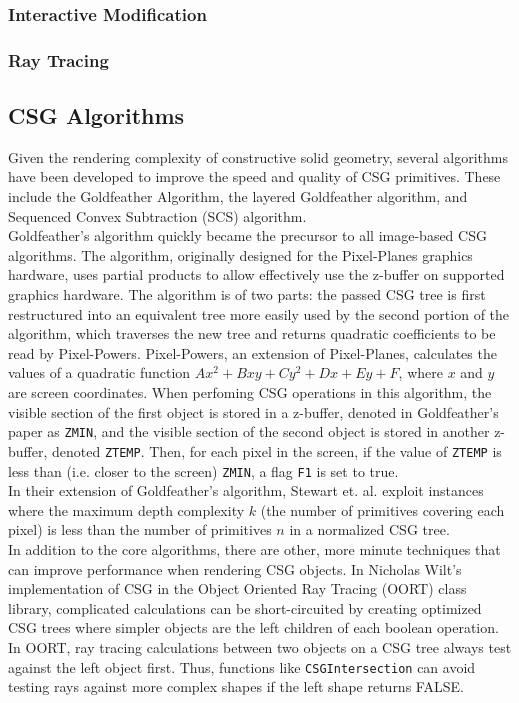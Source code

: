 \documentclass[12pt]{article}
\begin{document}
\begin{doublespace}
\subsubsection{Interactive Modification}
\subsubsection{Ray Tracing}
\subsection{CSG Algorithms}
Given the rendering complexity of constructive solid geometry, several algorithms have been developed to improve the speed and quality of CSG primitives. These include the Goldfeather Algorithm, the layered Goldfeather algorithm, and Sequenced Convex Subtraction (SCS) algorithm.\\

Goldfeather's algorithm quickly became the precursor to all image-based CSG algorithms\cite{hardware_csg}. The algorithm, originally designed for the Pixel-Planes graphics hardware, uses partial products to allow effectively use the z-buffer on supported graphics hardware\cite{hardware_csg}. The algorithm is of two parts: the passed CSG tree is first restructured into an equivalent tree more easily used by the second portion of the algorithm, which traverses the new tree and returns quadratic coefficients to be read by Pixel-Powers\cite{gold}. Pixel-Powers, an extension of Pixel-Planes, calculates the values of a quadratic function $Ax^2 + Bxy + Cy^2 + Dx + Ey + F$, where $x$ and $y$ are screen coordinates. When perfoming CSG operations in this algorithm, the visible section of the first object is stored in a z-buffer, denoted in Goldfeather's paper as \texttt{ZMIN}, and the visible section of the second object is stored in another z-buffer, denoted \texttt{ZTEMP}. Then, for each pixel in the screen, if the value of \texttt{ZTEMP} is less than (i.e. closer to the screen) \texttt{ZMIN}, a flag \texttt{F1} is set to true.\\

In their extension of Goldfeather's algorithm, Stewart et. al. exploit instances where the maximum depth complexity $k$ (the number of primitives covering each pixel) is less than the number of primitives $n$ in a normalized CSG tree\cite{layered_gold}.\\

In addition to the core algorithms, there are other, more minute techniques that can improve performance when rendering CSG objects. In Nicholas Wilt's implementation of CSG in the Object Oriented Ray Tracing (OORT) class library, complicated calculations can be short-circuited by creating optimized CSG trees where simpler objects are the left children of each boolean operation. In OORT, ray tracing calculations between two objects on a CSG tree always test against the left object first. Thus, functions like \texttt{CSGIntersection} can avoid testing rays against more complex shapes if the left shape returns FALSE\cite{raytrace}.

\end{doublespace}
\end{document}
